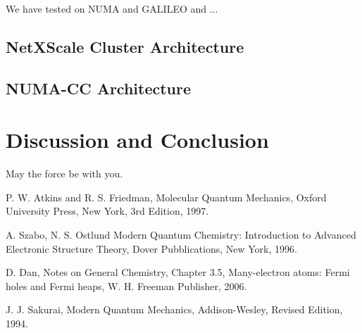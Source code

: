 \documentclass[a4paper,12pt]{article}
\begin{document}
We have tested on NUMA and GALILEO and ...


\subsection{NetXScale Cluster Architecture}\label{galileoarch:sec}
\subsection{NUMA-CC Architecture}\label{numaarch:sec}


\section{Discussion and Conclusion}

May the force be with you.



\clearpage
{}
\begin{thebibliography}{9}


%
%

P. W. Atkins and R. S. Friedman,
Molecular Quantum Mechanics,
Oxford University Press, New York,
3rd Edition,
1997.

A. Szabo, N. S. Ostlund
Modern Quantum Chemistry: Introduction to Advanced Electronic Structure Theory,
Dover Pubblications, New York,
1996.

D. Dan, Notes on General Chemistry,
Chapter 3.5, Many-electron atoms: Fermi holes and Fermi heaps,
W. H. Freeman Publisher,
2006.

J. J. Sakurai,
Modern Quantum Mechanics,
Addison-Wesley,
Revised Edition,
1994.

\end{thebibliography}
\end{document}
